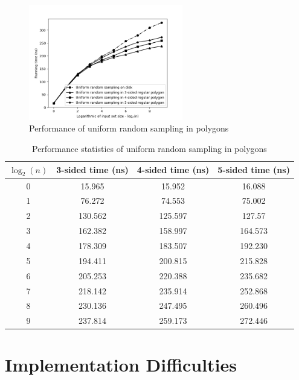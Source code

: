 \documentclass{article}
\begin{document}
\begin{figure}[h]
    \includegraphics[width=0.6\textwidth]{uniform_polygon_input}
    \caption{Performance of uniform random sampling in polygons}
    \label{fig:uniform_polygon_input}
\end{figure}

\begin{table}[h]
    \begin{tabular}{cccc}
        $\log_2(n)$ & 3-sided time (ns) & 4-sided time (ns) & 5-sided time (ns) \\
        \hline
        0 & 15.965 & 15.952 & 16.088 \\
        1 & 76.272 & 74.553 & 75.002 \\
        2 & 130.562 & 125.597 & 127.57 \\
        3 & 162.382 & 158.997 & 164.573 \\
        4 & 178.309 & 183.507 & 192.230 \\
        5 & 194.411 & 200.815 & 215.828 \\
        6 & 205.253 & 220.388 & 235.682 \\
        7 & 218.142 & 235.914 & 252.868 \\
        8 & 230.136 & 247.495 & 260.496 \\
        9 & 237.814 & 259.173 & 272.446
    \end{tabular}
    \caption{Performance statistics of uniform random sampling in polygons}
    \label{tab:uniform_polygon_input}
\end{table}



\section{Implementation Difficulties}
\end{document}
